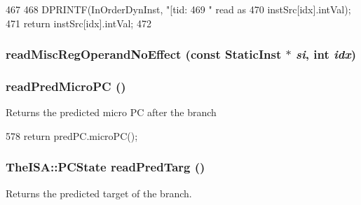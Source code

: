 \begin{DoxyCode}
467 {
468     DPRINTF(InOrderDynInst, "[tid:%
469             " read as %
470             instSrc[idx].intVal);
471     return instSrc[idx].intVal;
472 }
\end{DoxyCode}
\hypertarget{classInOrderDynInst_af527fa993c1c80fdc58ab56a069bdd01}{
\subsubsection[{readMiscRegOperandNoEffect}]{ readMiscRegOperandNoEffect (const {\bf StaticInst} $\ast$ {\em si}, \/  int {\em idx})}}
\label{classInOrderDynInst_af527fa993c1c80fdc58ab56a069bdd01}
\hypertarget{classInOrderDynInst_acdc4199624829ee5de551179f240af8f}{
\subsubsection[{readPredMicroPC}]{ readPredMicroPC ()}}
\label{classInOrderDynInst_acdc4199624829ee5de551179f240af8f}
Returns the predicted micro PC after the branch 


\begin{DoxyCode}
578 { return predPC.microPC(); }
\end{DoxyCode}
\hypertarget{classInOrderDynInst_a8d36943d774b2b8b830a4be232f23360}{
\subsubsection[{readPredTarg}]{\setlength{\rightskip}{0pt plus 5cm}TheISA::PCState readPredTarg ()}}
\label{classInOrderDynInst_a8d36943d774b2b8b830a4be232f23360}
Returns the predicted target of the branch. 



